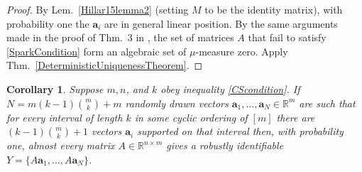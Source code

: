 \documentclass[journal, twocolumn]{IEEEtran}
\newtheorem{corollary}{Corollary}
\begin{document}
\begin{proof}
By Lem.~\ref{Hillar15lemma2} (setting $M$ to be the identity matrix), with probability one the $\mathbf{a}_i$ are in general linear position. By the same arguments made in the proof of Thm.~3 in \cite{Hillar15}, the set of matrices $A$ that fail to satisfy \eqref{SparkCondition} form an algebraic set of $\mu$-measure zero. Apply Thm.~\ref{DeterministicUniquenessTheorem}.
\end{proof}

\begin{corollary}
Suppose $m, n$, and $k$ obey inequality \eqref{CScondition}.  If $N = m(k-1){m \choose k}+m$ randomly drawn vectors $\mathbf{a}_1, \ldots, \mathbf{a}_N \in \mathbb{R}^m$ are such that for every interval of length $k$ in some cyclic ordering of $[m]$ there are $(k-1){m \choose k}+1$ vectors $\mathbf{a}_i$ supported on that interval then, with probability one, almost every matrix $A \in \mathbb{R}^{n \times m}$ gives a robustly identifiable $Y = \{A\mathbf{a}_1, \ldots , A\mathbf{a}_N \}$.
\end{corollary}
\end{document}
